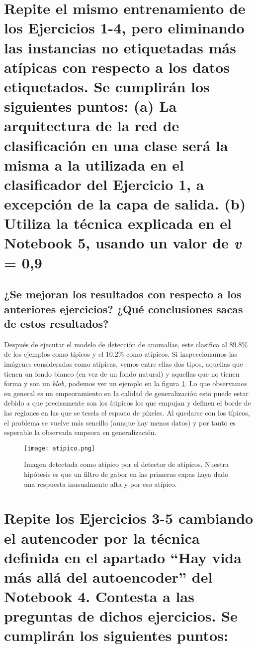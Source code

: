 \documentclass{article}
\begin{document}
\newpage
\section{Repite el mismo entrenamiento de los Ejercicios 1-4, pero eliminando las instancias no etiquetadas más atípicas con respecto a los datos etiquetados. Se cumplirán los siguientes puntos: (a) La arquitectura de la red de clasificación en una clase será la misma a la utilizada en el clasificador del Ejercicio 1, a excepción de la capa de salida. (b) Utiliza la técnica explicada en el Notebook 5, usando un valor de \textit{v} = 0,9}
\subsection{¿Se mejoran los resultados con respecto a los anteriores ejercicios? ¿Qué conclusiones sacas de estos resultados?}

Después de ejecutar el modelo de detección de anomalías, este clasifica al 89.8\% de los ejemplos como típicos y el 10.2\% como atípicos. Si inspeccionamos las imágenes consideradas como atípicas, vemos entre ellas dos tipos, aquellas que tienen un fondo blanco (en vez de un fondo natural) y aquellas que no tienen forma y son un \emph{blob}, podemos ver un ejemplo en la figura \ref{fig:atipico}. Lo que observamos en general es un empeoramiento en la calidad de generalización esto puede estar debido a que precisamente son los átipicos los que empujan y definen el borde de las regiones en las que se tesela el espacio de píxeles. Al quedarse con los típicos, el problema se vuelve más sencillo (aunque hay menos datos) y por tanto es esperable la observada empeora en generalización.

\begin{figure}[h]
    \centering
    \texttt{[image: atipico.png]}
    \caption{Imagen detectada como atípico por el detector de atípicos. Nuestra hipótesis es que un filtro de gabor en las primeras capas haya dado una respuesta inusualmente alta y por eso atípico.}
    \label{fig:atipico}
\end{figure}

\newpage
\section{Repite los Ejercicios 3-5 cambiando el autencoder por la técnica definida en el apartado ``Hay vida más allá del autoencoder'' del Notebook 4. Contesta a las preguntas de dichos ejercicios. Se cumplirán los siguientes puntos: }
\end{document}

